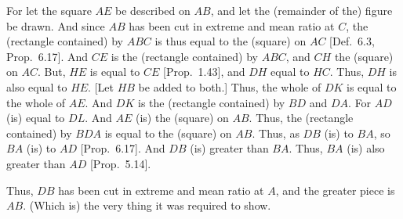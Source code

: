 \begin{Parallel}{}{}
{For let the square $AE$ be described on $AB$, and
let the (remainder of the) figure be drawn. And since
$AB$ has been cut in extreme and mean ratio at $C$, the (rectangle
contained) by $ABC$ is thus equal to the (square) on $AC$
[Def.~6.3, Prop.~6.17].  And $CE$ is the (rectangle contained)
by  $ABC$,  and $CH$ the (square) on $AC$. But, $HE$ is equal
to $CE$ [Prop.~1.43], and $DH$ equal to $HC$. Thus, $DH$ is also
equal to $HE$. [Let $HB$ be added to both.] Thus, the whole
of $DK$ is equal to the whole of $AE$. And $DK$ is the
(rectangle contained) by $BD$ and $DA$. For $AD$ (is) equal to
$DL$. And $AE$ (is) the (square) on $AB$.  Thus, the (rectangle
contained) by $BDA$ is equal to the (square) on $AB$. Thus, as
$DB$ (is) to $BA$, so $BA$ (is) to $AD$ [Prop.~6.17]. And
$DB$ (is) greater than $BA$. Thus, $BA$ (is) also greater
than $AD$ [Prop.~5.14].

Thus, $DB$ has been cut in extreme and mean ratio at $A$, and the
greater piece is $AB$. (Which is) the very thing it was required to show.}
\end{Parallel}

